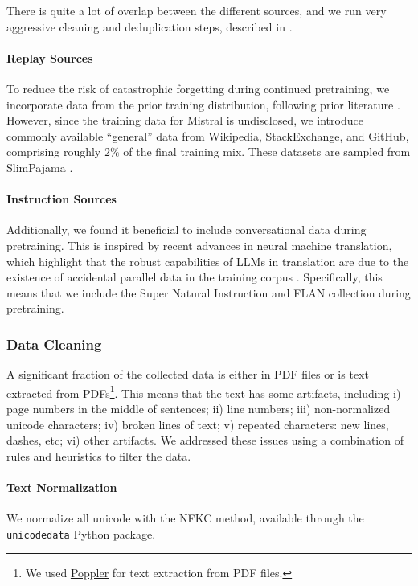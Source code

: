 There is quite a lot of overlap between the different sources, and we run very aggressive cleaning and deduplication steps, described in .

\paragraph{Replay Sources}
To reduce the risk of catastrophic forgetting \citep{MCCLOSKEY1989109} during continued pretraining, we incorporate data from the prior training distribution, following prior literature \cite{chen2023meditron,sun2020distill}. However, since the training data for Mistral is undisclosed, we introduce commonly available ``general'' data from Wikipedia, StackExchange, and GitHub, comprising roughly $2\%$ of the final training mix. These datasets are sampled from SlimPajama \cite{shen2023slimpajama,together2023redpajama,soboleva2023slimpajama}.

\paragraph{Instruction Sources}
Additionally, we found it beneficial to include conversational data during pretraining. This is inspired by recent advances in neural machine translation, which highlight that the robust capabilities of LLMs in translation are due to the existence of accidental parallel data in the training corpus \cite{anil2023palm,briakou2023searching}. Specifically, this means that we include the Super Natural Instruction \cite{wang2022super} and FLAN collection \cite{longpre2023flan} during pretraining.

\subsubsection{Data Cleaning}
\label{sec:data_cleaning}

A significant fraction of the collected data is either in PDF files or is text extracted from PDFs\footnote{We used \href{https://poppler.freedesktop.org/}{Poppler} for text extraction from PDF files.}. This means that the text has some artifacts, including i) page numbers in the middle of sentences; ii) line numbers; iii) non-normalized unicode characters; iv) broken lines of text; v) repeated characters: new lines, dashes, etc; vi) other artifacts. We addressed these issues using a combination of rules and heuristics to filter the data.

\paragraph{Text Normalization}
We normalize all unicode with the NFKC method, available through the \texttt{unicodedata} Python package.

